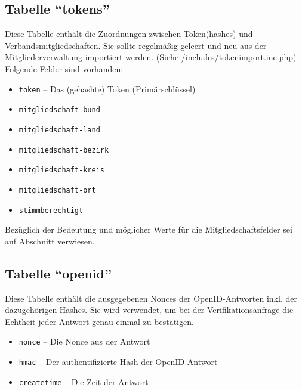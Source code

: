 \subsection{Tabelle "`tokens"'}
Diese Tabelle enthält die Zuordnungen zwischen Token(hashes) und Verbandsmitgliedschaften.
Sie sollte regelmäßig geleert und neu aus der Mitgliederverwaltung importiert werden. (Siehe /includes/tokenimport.inc.php)
Folgende Felder sind vorhanden:
\begin{itemize}
	\item \texttt{token} -- Das (gehashte) Token (Primärschlüssel)
	\item \texttt{mitgliedschaft-bund}
	\item \texttt{mitgliedschaft-land}
	\item \texttt{mitgliedschaft-bezirk}
	\item \texttt{mitgliedschaft-kreis}
	\item \texttt{mitgliedschaft-ort}
	\item \texttt{stimmberechtigt}
\end{itemize}

Bezüglich der Bedeutung und möglicher Werte für die Mitgliedschaftsfelder sei auf Abschnitt  verwiesen.

\subsection{Tabelle "`openid"'}
Diese Tabelle enthält die ausgegebenen Nonces der OpenID-Antworten inkl. der dazugehörigen Hashes.
Sie wird verwendet, um bei der Verifikationsanfrage die Echtheit jeder Antwort genau einmal zu bestätigen.
\begin{itemize}
	\item \texttt{nonce} -- Die Nonce aus der Antwort
	\item \texttt{hmac} -- Der authentifizierte Hash der OpenID-Antwort
	\item \texttt{createtime} -- Die Zeit der Antwort
\end{itemize}

